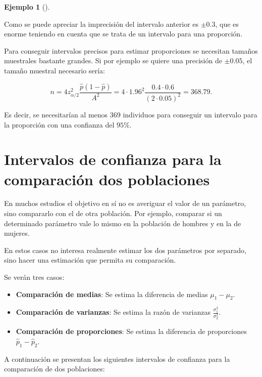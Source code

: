 \documentclass[
  a4paper,
]{scrreport}
\providecommand{\tightlist}{%
  \setlength{\itemsep}{0pt}\setlength{\parskip}{0pt}}\usepackage{longtable,booktabs,array}
\theoremstyle{plain}
\theoremstyle{definition}
\newtheorem{example}{Ejemplo}[chapter]
\theoremstyle{definition}
\theoremstyle{remark}
\begin{document}
\begin{example}[]\protect\hypertarget{exm-tamaño-muestral-intervalo-confianza-proporcion}{}\label{exm-tamaño-muestral-intervalo-confianza-proporcion}

Como se puede apreciar la imprecisión del intervalo anterior es
\(\pm 0.3\), que es enorme teniendo en cuenta que se trata de un
intervalo para una proporción.

Para conseguir intervalos precisos para estimar proporciones se
necesitan tamaños muestrales bastante grandes. Si por ejemplo se quiere
una precisión de \(\pm 0.05\), el tamaño muestral necesario sería:

\[
n= 4 z_{\alpha/2}^2\frac{\hat{p}(1-\hat{p})}{A^2}=4\cdot 1.96^2\frac{0.4\cdot 0.6}{(2\cdot0.05)^2}= 368.79.
\]

Es decir, se necesitarían al menos 369 individuos para conseguir un
intervalo para la proporción con una confianza del \(95\%\).

\end{example}

\section{Intervalos de confianza para la comparación dos
poblaciones}\label{intervalos-de-confianza-para-la-comparaciuxf3n-dos-poblaciones}

En muchos estudios el objetivo en sí no es averiguar el valor de un
parámetro, sino compararlo con el de otra población. Por ejemplo,
comparar si un determinado parámetro vale lo mismo en la población de
hombres y en la de mujeres.

En estos casos no interesa realmente estimar los dos parámetros por
separado, sino hacer una estimación que permita su comparación.

Se verán tres casos:

\begin{itemize}
\tightlist
\item
  \textbf{Comparación de medias}: Se estima la diferencia de medias
  \(\mu_1-\mu_2\).
\item
  \textbf{Comparación de varianzas}: Se estima la razón de varianzas
  \(\displaystyle \frac{\sigma^2_1}{\sigma^2_2}\).
\item
  \textbf{Comparación de proporciones}: Se estima la diferencia de
  proporciones \(\hat p_1-\hat p_2\).
\end{itemize}

A continuación se presentan los siguientes intervalos de confianza para
la comparación de dos poblaciones:
\end{document}
